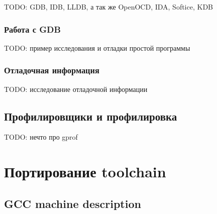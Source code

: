 \documentclass[a4paper,12pt,oneside]{article}
\begin{document}
TODO: GDB, IDB, LLDB, а так же OpenOCD, IDA, Softice, KDB

\subsubsection{Работа с GDB}\label{subsubsec:GDB}

TODO: пример исследования и отладки простой программы

\subsubsection{Отладочная информация}\label{subsubsec:DWARF}

TODO: исследование отладочной информации

\subsection{Профилировщики и профилировка}\label{subsec:GPROF}

TODO: нечто про gprof

\section{Портирование toolchain}

\subsection{GCC machine description}
\end{document}

